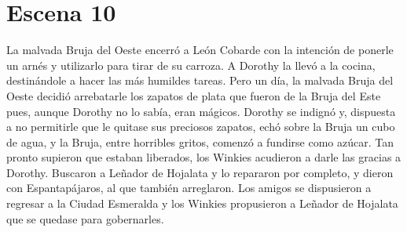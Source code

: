 \chapter{Escena 10}
La malvada Bruja del Oeste encerró a León Cobarde con la intención de ponerle un arnés y utilizarlo para tirar de su carroza. A Dorothy la llevó a la cocina, destinándole a hacer las más humildes tareas.
Pero un día, la malvada Bruja del Oeste decidió arrebatarle los zapatos de plata que fueron de la Bruja del Este pues, aunque Dorothy no lo sabía, eran mágicos. Dorothy se indignó y, dispuesta a no permitirle que le quitase sus preciosos zapatos, echó sobre la Bruja un cubo de agua, y la Bruja, entre horribles gritos, comenzó a fundirse como azúcar.
Tan pronto supieron que estaban liberados, los Winkies acudieron a darle las gracias a Dorothy. Buscaron a Leñador de Hojalata y lo repararon por completo, y dieron con Espantapájaros, al que también arreglaron. Los amigos se dispusieron a regresar a la Ciudad Esmeralda y los Winkies propusieron a Leñador de Hojalata que se quedase para gobernarles.